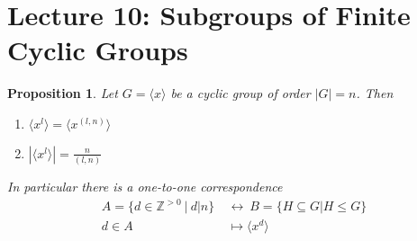 \documentclass{article}
\newtheorem{theorem}{Proposition}[section]
\theoremstyle{definition}
\theoremstyle{remark}
\begin{document}
\section{Lecture 10: Subgroups of Finite Cyclic Groups}
\begin{theorem}
\label{subgoffinitecycG1}
Let $G=\langle x\rangle$ be a cyclic group of order $|G|=n$. Then
\begin{enumerate}
\item $\langle x^l\rangle =\langle x^{(l,n)}\rangle$
\item $|\langle x^l\rangle|=\frac{n}{(l,n)}$
\end{enumerate}
In particular there is a one-to-one correspondence
\begin{align*}
A=\lbrace d\in\mathbb{Z}^{>0}~|~d|n\rbrace ~&\leftrightarrow ~B=\lbrace H \subseteq G | H\leq G\rbrace\\
d\in A&\mapsto\langle x^d\rangle
\end{align*}
\end{theorem}
\end{document}
